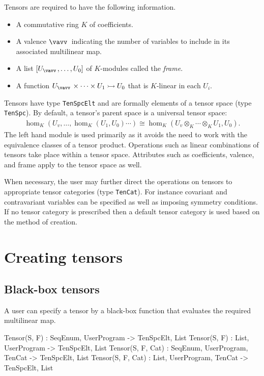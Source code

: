 
Tensors are required to have the following information.
\begin{itemize}
\item A commutative ring $K$ of coefficients.
\item A valence $\vav$ indicating the number of variables to include in its 
associated multilinear map.
\item A list $[U_{\vav},\dots, U_0]$ of $K$-modules called the \emph{frame}.
\item A function $U_{\vav}\times \cdots \times U_1\rightarrowtail U_0$ that is $K$-linear in each $U_i$.
\end{itemize}
Tensors have type \texttt{TenSpcElt} and are formally elements of a tensor space 
(type \texttt{TenSpc}).  
By default, a tensor's parent space is a universal tensor space:
\begin{align*}
	\hom_K(U_v,\dots,\hom_K(U_1,U_0)\cdots) \cong \hom_K(U_v\otimes_K\cdots \otimes_K U_1,U_0).
\end{align*}
The left hand module is used primarily as it avoids the need to work with 
the equivalence classes of a tensor product.
Operations such as linear combinations of tensors take place within a  
tensor space.
Attributes such as coefficients, valence, and frame  apply to the tensor space 
as well.

When necessary, the user may further direct the operations on tensors to 
appropriate tensor categories 
(type \texttt{TenCat}).  For instance covariant and contravariant variables can 
be specified
as well as imposing symmetry conditions.  If no tensor category is prescribed
then a default tensor category is used based on the method of creation.
\medskip

\minitoc

\section{Creating tensors}

\subsection{Black-box tensors}
A user can specify a tensor by a black-box function that evaluates the required
multilinear map.

\begin{intrinsics}
Tensor(S, F) : SeqEnum, UserProgram -> TenSpcElt, List
Tensor(S, F) : List, UserProgram -> TenSpcElt, List
Tensor(S, F, Cat) : SeqEnum, UserProgram, TenCat -> TenSpcElt, List
Tensor(S, F, Cat) : List, UserProgram, TenCat -> TenSpcElt, List
\end{intrinsics}

